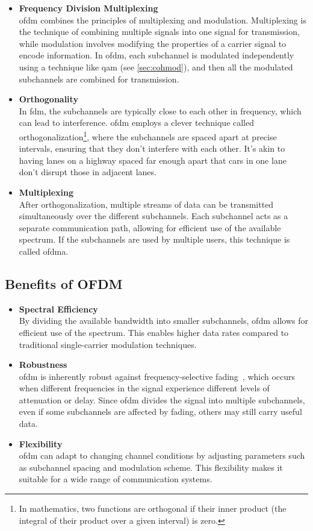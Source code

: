 \begin{itemize}
    \item[]\textbf{Frequency Division Multiplexing}\\ \Gls{ofdm} combines the principles of multiplexing and modulation. Multiplexing is the technique of combining multiple signals into one signal for transmission, while modulation involves modifying the properties of a carrier signal to encode information. In \gls{ofdm}, each subchannel is modulated independently using a technique like \gls{qam} (see \cref{sec:cohmod}), and then all the modulated subchannels are combined for transmission.
    \item[]\textbf{Orthogonality}\\
In \gls{fdm}, the subchannels are typically close to each other in frequency, which can lead to interference. \gls{ofdm} employs a clever technique called orthogonalization\footnote{In mathematics, two functions are orthogonal if their inner product (the integral of their product over a given interval) is zero.}, where the subchannels are spaced apart at precise intervals, ensuring that they don't interfere with each other. It's akin to having lanes on a highway spaced far enough apart that cars in one lane don't disrupt those in adjacent lanes.
\item[]\textbf{Multiplexing}\\
After orthogonalization, multiple streams of data can be transmitted simultaneously over the different subchannels. Each subchannel acts as a separate communication path, allowing for efficient use of the available spectrum. If the subchannels are used by multiple users, this technique is called \gls{ofdma}.
\end{itemize}

\subsection{Benefits of OFDM}

\begin{itemize}
    \item[] \textbf{Spectral Efficiency}\\
    By dividing the available bandwidth into smaller subchannels, \gls{ofdm} allows for efficient use of the spectrum. This enables higher data rates compared to traditional single-carrier modulation techniques.
    \item[] \textbf{Robustness}\\
    \Gls{ofdm} is inherently robust against frequency-selective fading~\cite{MCMorelli}, which occurs when different frequencies in the signal experience different levels of attenuation or delay. Since \gls{ofdm} divides the signal into multiple subchannels, even if some subchannels are affected by fading, others may still carry useful data.
    \item[] \textbf{Flexibility}\\
    \Gls{ofdm} can adapt to changing channel conditions by adjusting parameters such as subchannel spacing and modulation scheme. This flexibility makes it suitable for a wide range of communication systems.
\end{itemize}


